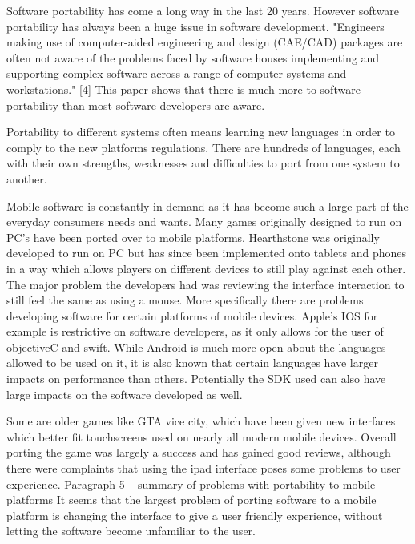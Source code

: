 \documentclass{scrartcl}
\begin{document}
\cite{bramer1988problems}

Software portability has come a long way in the last 20 years. However software portability has always been a huge issue in software development. "Engineers making use of computer-aided engineering and design (CAE/CAD) packages are often not aware of the problems faced by software houses implementing and supporting complex software across a range of computer systems and workstations." [4] This paper shows that there is much more to software portability than most software developers are aware. 

Portability to different systems often means learning new languages in order to comply to the new platforms regulations. There are hundreds of languages, each with their own strengths, weaknesses and difficulties to port from one system to another. 

Mobile software is constantly in demand as it has become such a large part of the everyday consumers needs and wants. Many games originally designed to run on PC's have been ported over to mobile platforms. Hearthstone was originally developed to run on PC but has since been implemented onto tablets and phones in a way which allows players on different devices to still play against each other.  The major problem the developers had was reviewing the interface interaction to still feel the same as using a mouse. 
More specifically there are problems developing software for certain platforms of mobile devices. Apple's IOS for example is restrictive on software developers, as it only allows for the user of objectiveC and swift. While Android is much more open about the languages allowed to be used on it, it is also known that certain languages have larger impacts on performance than others. Potentially the SDK used can also have large impacts on the software developed as well. 

Some are older games like GTA vice city, which have been given new interfaces which better fit touchscreens used on nearly all modern mobile devices. Overall porting the game was largely a success and has gained good reviews, although there were complaints that using the ipad interface poses some problems to user experience. 
Paragraph 5 – summary of problems with portability to mobile platforms
It seems that the largest problem of porting software to a mobile platform is changing the interface to give a user friendly experience, without letting the software become unfamiliar to the user.
\end{document}
